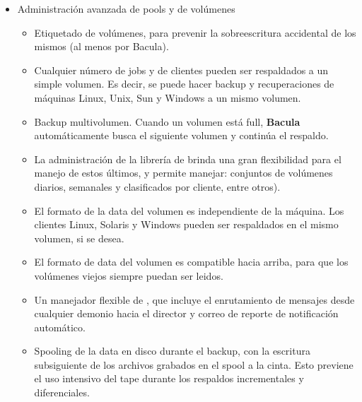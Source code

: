 \begin{itemize}
\item Administración avanzada de pools y de volúmenes
   \begin{itemize}
   \item Etiquetado de volúmenes, para prevenir la sobreescritura accidental de los mismos
      (al menos por Bacula).
   \item Cualquier número de jobs y de clientes pueden ser respaldados a un simple volumen.
      Es decir, se puede hacer backup y recuperaciones de máquinas Linux, Unix, Sun y Windows
      a un mismo volumen.  
   \item Backup multivolumen. Cuando un volumen está full, \textbf {Bacula}  automáticamente
      busca el siguiente volumen y continúa el respaldo.  
   \item La administración de la librería de
      brinda una gran flexibilidad para el manejo de estos últimos, y permite manejar:
      conjuntos de volúmenes diarios, semanales y clasificados por cliente, entre otros). 
   \item El formato de la data del volumen es independiente de la máquina. Los clientes Linux,
      Solaris y Windows pueden ser respaldados en el mismo volumen, si se desea. 
   \item El formato de data del volumen es compatible hacia arriba, para que los volúmenes
      viejos siempre puedan ser leidos.
   \item Un manejador flexible de
      ,  que incluye
      el enrutamiento de mensajes desde cualquier demonio hacia el director y correo de
      reporte de notificación automático. 
   \item Spooling de la data en disco durante el backup, con la escritura subsiguiente de
      los archivos grabados en el spool a la cinta. Esto previene el uso intensivo del
      tape durante los respaldos incrementales y diferenciales.  
   \end{itemize}


\end{itemize}
